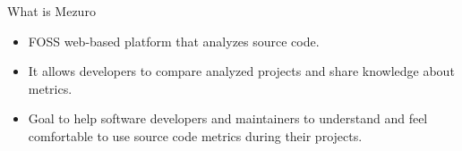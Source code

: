\begin{block}{What is Mezuro}
    \begin{itemize}
        \item FOSS web-based platform that analyzes source code.

        \item It allows developers to compare analyzed projects and share
            knowledge about metrics.

        \item Goal to help software developers and maintainers to understand
            and feel comfortable to use source code metrics during their projects.
    \end{itemize}
\end{block}
